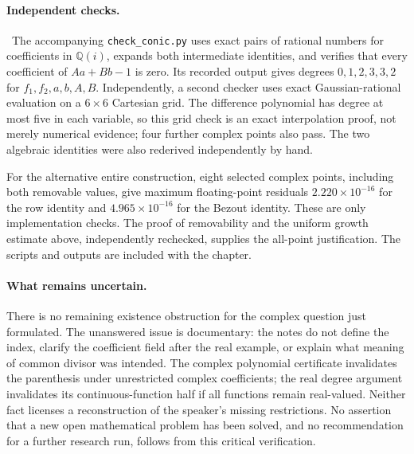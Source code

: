 \paragraph{Independent checks.}
\oursComputed\ The accompanying \texttt{check\_conic.py} uses exact pairs of
rational numbers for coefficients in \(\mathbb Q(i)\), expands both
intermediate identities, and verifies that every coefficient of
\(Aa+Bb-1\) is zero. Its recorded output gives degrees
\(0,1,2,3,3,2\) for \(f_1,f_2,a,b,A,B\). Independently, a second checker
uses exact Gaussian-rational evaluation on a \(6\times6\) Cartesian grid.
The difference polynomial has degree at most five in each variable, so this
grid check is an exact interpolation proof, not merely numerical evidence;
four further complex points also pass. The two algebraic identities were
also rederived independently by hand.

For the alternative entire construction, eight selected complex points,
including both removable values, give maximum floating-point residuals
\(2.220\times10^{-16}\) for the row identity and
\(4.965\times10^{-16}\) for the Bezout identity. These are only implementation
checks. The proof of removability and the uniform growth estimate above,
independently rechecked, supplies the all-point justification. The scripts and
outputs are included with the chapter.

\paragraph{What remains uncertain.}
There is no remaining existence obstruction for the complex question just
formulated. The unanswered issue is documentary: the notes do not define the
index, clarify the coefficient field after the real example, or explain what
meaning of common divisor was intended. The complex polynomial certificate
invalidates the parenthesis under unrestricted complex coefficients; the real
degree argument invalidates its continuous-function half if all functions
remain real-valued. Neither fact licenses a reconstruction of the speaker's
missing restrictions. No assertion that a new open mathematical problem has
been solved, and no recommendation for a further research run, follows from
this critical verification.
